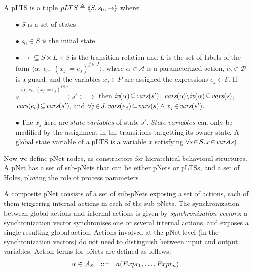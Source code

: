 \documentclass{lncs/llncs}
\def\AlgE{\mathcal{E}}
\def\AlgA{\mathcal{A}}
\def\AlgAS{\mathcal{A}_S}
\def\AlgB{\mathcal{B}}
\begin{document}
\begin{definition}[pLTS]
\label{pLTS}
A pLTS is a tuple
$pLTS\triangleq\langle\hspace{-0.58ex}\langle S,s_0, \to\rangle\hspace{-0.58ex}\rangle$ where:
\begin{itemize}
\item[$\bullet$]
$S$ is a set of states.
\item[$\bullet$]
$s_0 \in S$ is the initial state.
\item[$\bullet$] $\to \subseteq S \times L \times S$ is the transition relation and 
$L$ is the set of labels of the form
$\langle \alpha,~e_b,~(x_j\!:= {e}_j)^{j\in J}\rangle$,
where $\alpha \in\AlgA$ is a parameterized action, $e_b \in
\AlgB$ is a guard, and the variables $x_j\in P$
are assigned the expressions $e_j\in \AlgE$.
If 
$s \xrightarrow{\langle \alpha,~e_b,~(x_j\!:= {e}_j)^{j\in
		J}\rangle} s'\in \to $ then $\iv(\alpha)\!\subseteq\! \vars(s')$, 
		$\vars(\alpha)\backslash \iv(\alpha)\!\subseteq\! \vars(s)$, 
		$\vars(e_b)\!\subseteq\! \vars(s')$, and
		$\forall j\!\in\! J .\,\vars(e_j)\!\subseteq\! \vars(s)\land 
		x_j\!\in\!\vars(s')$. %
\item[$\bullet$]
The $x_j$ here are $state\ variables$ of state $s'$. $State\ variables$ can only be modified by the assignment in the transitions targetting its owner state. A global state variable of a pLTS is a variable $x$ satisfying $\forall s\!\in\! S .\, x\!\in\! \vars(s)$.


\end{itemize}
\end{definition}

Now we define
pNet nodes, as constructors for hierarchical behavioral structures.
A pNet has a set of sub-pNets that can be either pNets or pLTSs, and a
set of Holes, playing the role of process parameters.

A composite pNet consists of a set of sub-pNets exposing
a set of actions, each of them triggering internal actions in each of
the sub-pNets. The synchronization between global actions and
internal actions is given by  \emph{synchronization vectors}: a
synchronization vector synchronises one or several internal actions, and
exposes a single resulting global action.
Actions involved at the pNet level (in the synchronization vectors) do
not need to distinguish between input and output
variables. Action terms for pNets are defined as follows:
\[\begin{array}[l]{rcl@{\quad}l}
  \alpha\in \AlgAS &::=&a(Expr_1,\ldots,Expr_n)
\end{array}
\]
\end{document}
